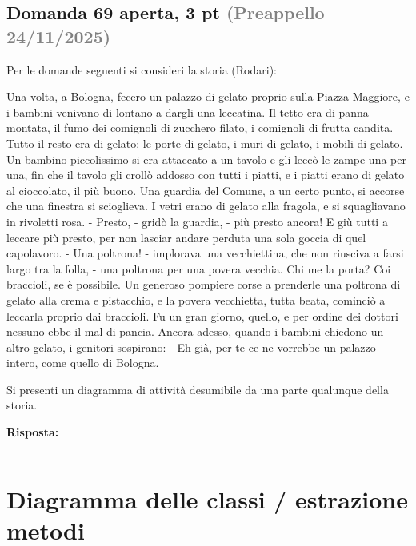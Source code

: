 \documentclass[a4paper,11pt]{article}
\begin{document}
\subsection*{Domanda 69 \hfill {\small aperta, 3 pt \textcolor{gray}{(Preappello 24/11/2025)}}}
\begin{tcolorbox}[colback=gray!8,colframe=gray!50,title=Contesto]
Per le domande seguenti si consideri la storia (Rodari):

Una volta, a Bologna, fecero un palazzo di gelato proprio sulla Piazza Maggiore, e i bambini venivano di lontano a dargli una leccatina. Il tetto era di panna montata, il fumo dei comignoli di zucchero filato, i comignoli di frutta candita. Tutto il resto era di gelato: le porte di gelato, i muri di gelato, i mobili di gelato. Un bambino piccolissimo si era attaccato a un tavolo e gli leccò le zampe una per una, fin che il tavolo gli crollò addosso con tutti i piatti, e i piatti erano di gelato al cioccolato, il più buono. Una guardia del Comune, a un certo punto, si accorse che una finestra si scioglieva. I vetri erano di gelato alla fragola, e si squagliavano in rivoletti rosa. - Presto, - gridò la guardia, - più presto ancora! E giù tutti a leccare più presto, per non lasciar andare perduta una sola goccia di quel capolavoro. - Una poltrona! - implorava una vecchiettina, che non riusciva a farsi largo tra la folla, - una poltrona per una povera vecchia. Chi me la porta? Coi braccioli, se è possibile. Un generoso pompiere corse a prenderle una poltrona di gelato alla crema e pistacchio, e la povera vecchietta, tutta beata, cominciò a leccarla proprio dai braccioli. Fu un gran giorno, quello, e per ordine dei dottori nessuno ebbe il mal di pancia. Ancora adesso, quando i bambini chiedono un altro gelato, i genitori sospirano: - Eh già, per te ce ne vorrebbe un palazzo intero, come quello di Bologna.
\end{tcolorbox}
Si presenti un diagramma di attività desumibile da una parte qualunque della storia.

\vspace{0.2cm}
\noindent\textbf{Risposta:}\par
\vspace{4cm}\hrule


\section{Diagramma delle classi / estrazione metodi}

\end{document}
